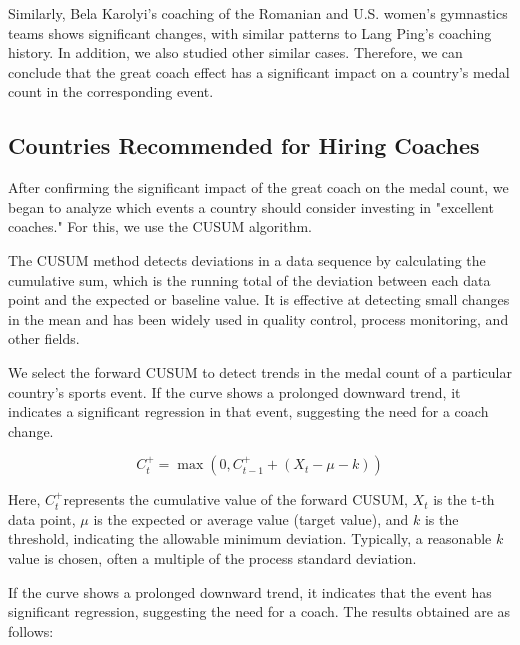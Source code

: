 \documentclass[12pt]{article}  %
\begin{document}
Similarly, Bela Karolyi's coaching of the Romanian and U.S. women's gymnastics teams shows significant changes, with similar patterns to Lang Ping's coaching history. In addition, we also studied other similar cases. Therefore, we can conclude that the great coach effect has a significant impact on a country's medal count in the corresponding event.


\subsection{Countries Recommended for Hiring Coaches}
After confirming the significant impact of the great coach on the medal count, we began to analyze which events a country should consider investing in "excellent coaches." For this, we use the CUSUM algorithm.

The CUSUM method detects deviations in a data sequence by calculating the cumulative sum, which is the running total of the deviation between each data point and the expected or baseline value. It is effective at detecting small changes in the mean and has been widely used in quality control, process monitoring, and other fields.

We select the forward CUSUM to detect trends in the medal count of a particular country's sports event. If the curve shows a prolonged downward trend, it indicates a significant regression in that event, suggesting the need for a coach change.

\begin{equation}
	C_t^+ = \max(0, C_{t-1}^+ + (X_t - \mu - k))
\end{equation}

Here, $C_t^+ $represents the cumulative value of the forward CUSUM, $X_t$ is the t-th data point, $\mu$ is the expected or average value (target value), and $k$ is the threshold, indicating the allowable minimum deviation. Typically, a reasonable $k$ value is chosen, often a multiple of the process standard deviation.

If the curve shows a prolonged downward trend, it indicates that the event has significant regression, suggesting the need for a coach. The results obtained are as follows:
\end{document}
